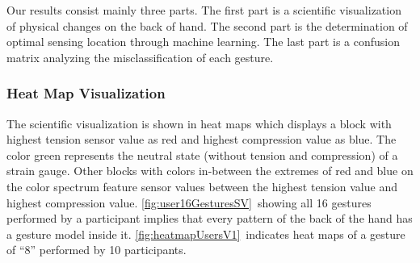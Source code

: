 \documentclass{sigchi}
\begin{document}
Our results consist mainly three parts. The first part is a scientific visualization of physical changes on the back of hand. The second part is the determination of optimal sensing location through machine learning. The last part is a confusion matrix analyzing the misclassification of each gesture.


\subsubsection{Heat Map Visualization}
The scientific visualization is shown in heat maps which displays a block with highest tension sensor value as red and highest compression value as blue. The color green represents the neutral state (without tension and compression) of a strain gauge. Other blocks with colors in-between the extremes of red and blue on the color spectrum feature sensor values between the highest tension value and highest compression value. \autoref{fig:user16GesturesSV}\ showing all 16 gestures performed by a participant implies that every pattern of the back of the hand has a gesture model inside it. \autoref{fig:heatmapUsersV1}\ indicates heat maps of a gesture of ``8'' performed by 10 participants. 

\end{document}
